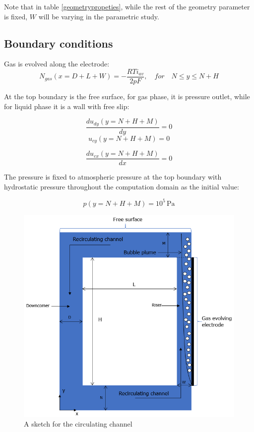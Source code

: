 Note that in table \ref{geometrypropeties}, while the rest of the geometry parameter is fixed, $W$ will be varying in the parametric study.



\subsection{Boundary conditions}

Gas is evolved along the electrode:
\begin{equation}
    N_{gas}(x = D+L+W) = -\frac{RTi_{av}}{2pF}, \quad for \quad N \leq y \leq N+H
\end{equation}

At the top boundary is the free surface, for gas phase, it is pressure outlet, while for liquid phase it is a wall with free slip:

\begin{equation}
    \frac{du_{dy}(y = N+H+M)}{dy} = 0
\end{equation}
\begin{equation}
    u_{cy}(y = N+H+M) = 0 
\end{equation}

\begin{equation}
    \frac{du_{cx}(y = N+H+M)}{dx} = 0 
\end{equation}

The pressure is fixed to atmospheric pressure at the top boundary with hydrostatic pressure throughout the computation domain as the initial value:

\begin{equation}
    p(y = N+H+M) = 10^5 \, \mathrm{Pa}
\end{equation}

\begin{figure}[H]
    \centering
    \includegraphics[scale=1]{recirculatingchannel.png}
    \caption{A sketch for the circulating channel}
    \label{circulatingchannel}
\end{figure}


